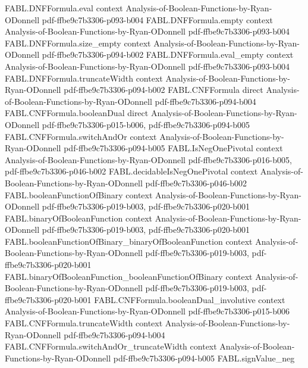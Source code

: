 \begin{theorem}
\proofstep
  {FABL.DNFFormula.eval}
  {context}
  {Analysis-of-Boolean-Functions-by-Ryan-ODonnell}
  {pdf-ffbe9c7b3306-p093-b004}
\proofstep
  {FABL.DNFFormula.empty}
  {context}
  {Analysis-of-Boolean-Functions-by-Ryan-ODonnell}
  {pdf-ffbe9c7b3306-p093-b004}
\proofstep
  {FABL.DNFFormula.size_empty}
  {context}
  {Analysis-of-Boolean-Functions-by-Ryan-ODonnell}
  {pdf-ffbe9c7b3306-p094-b002}
\proofstep
  {FABL.DNFFormula.eval_empty}
  {context}
  {Analysis-of-Boolean-Functions-by-Ryan-ODonnell}
  {pdf-ffbe9c7b3306-p093-b004}
\proofstep
  {FABL.DNFFormula.truncateWidth}
  {context}
  {Analysis-of-Boolean-Functions-by-Ryan-ODonnell}
  {pdf-ffbe9c7b3306-p094-b002}
\proofstep
  {FABL.CNFFormula}
  {direct}
  {Analysis-of-Boolean-Functions-by-Ryan-ODonnell}
  {pdf-ffbe9c7b3306-p094-b004}
\proofstep
  {FABL.CNFFormula.booleanDual}
  {direct}
  {Analysis-of-Boolean-Functions-by-Ryan-ODonnell}
  {pdf-ffbe9c7b3306-p015-b006,
    pdf-ffbe9c7b3306-p094-b005}
\proofstep
  {FABL.CNFFormula.switchAndOr}
  {context}
  {Analysis-of-Boolean-Functions-by-Ryan-ODonnell}
  {pdf-ffbe9c7b3306-p094-b005}
\proofstep
  {FABL.IsNegOnePivotal}
  {context}
  {Analysis-of-Boolean-Functions-by-Ryan-ODonnell}
  {pdf-ffbe9c7b3306-p016-b005,
    pdf-ffbe9c7b3306-p046-b002}
\proofstep
  {FABL.decidableIsNegOnePivotal}
  {context}
  {Analysis-of-Boolean-Functions-by-Ryan-ODonnell}
  {pdf-ffbe9c7b3306-p046-b002}
\proofstep
  {FABL.booleanFunctionOfBinary}
  {context}
  {Analysis-of-Boolean-Functions-by-Ryan-ODonnell}
  {pdf-ffbe9c7b3306-p019-b003,
    pdf-ffbe9c7b3306-p020-b001}
\proofstep
  {FABL.binaryOfBooleanFunction}
  {context}
  {Analysis-of-Boolean-Functions-by-Ryan-ODonnell}
  {pdf-ffbe9c7b3306-p019-b003,
    pdf-ffbe9c7b3306-p020-b001}
\proofstep
  {FABL.booleanFunctionOfBinary_binaryOfBooleanFunction}
  {context}
  {Analysis-of-Boolean-Functions-by-Ryan-ODonnell}
  {pdf-ffbe9c7b3306-p019-b003,
    pdf-ffbe9c7b3306-p020-b001}
\proofstep
  {FABL.binaryOfBooleanFunction_booleanFunctionOfBinary}
  {context}
  {Analysis-of-Boolean-Functions-by-Ryan-ODonnell}
  {pdf-ffbe9c7b3306-p019-b003,
    pdf-ffbe9c7b3306-p020-b001}
\proofstep
  {FABL.CNFFormula.booleanDual_involutive}
  {context}
  {Analysis-of-Boolean-Functions-by-Ryan-ODonnell}
  {pdf-ffbe9c7b3306-p015-b006}
\proofstep
  {FABL.CNFFormula.truncateWidth}
  {context}
  {Analysis-of-Boolean-Functions-by-Ryan-ODonnell}
  {pdf-ffbe9c7b3306-p094-b004}
\proofstep
  {FABL.CNFFormula.switchAndOr_truncateWidth}
  {context}
  {Analysis-of-Boolean-Functions-by-Ryan-ODonnell}
  {pdf-ffbe9c7b3306-p094-b005}
\proofstep
  {FABL.signValue_neg}

\end{theorem}
